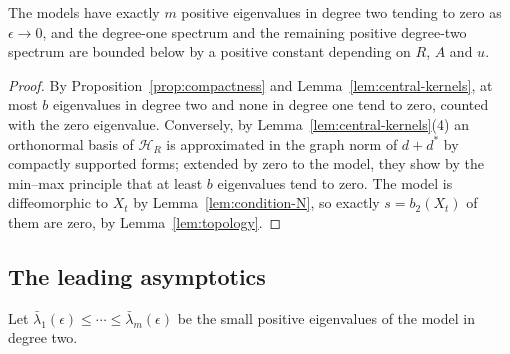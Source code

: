 \begin{proposition}\label{prop:count}
The models have exactly $m$ positive eigenvalues in degree two tending to
zero as $\epsilon\to0$, and the degree-one spectrum and the remaining
positive degree-two spectrum are bounded below by a positive constant
depending on $R$, $A$ and $u$.
\end{proposition}
\begin{proof}
By Proposition~\ref{prop:compactness} and
Lemma~\ref{lem:central-kernels}, at most $b$ eigenvalues in degree two
and none in degree one tend to zero, counted with the zero eigenvalue.
Conversely, by Lemma~\ref{lem:central-kernels}(4) an orthonormal basis of
$\mathcal H_R$ is approximated in the graph norm of $d+d^*$ by compactly
supported forms; extended by zero to the model, they show by the min--max
principle that at least $b$ eigenvalues tend to zero. The model is
diffeomorphic to $X_t$ by Lemma~\ref{lem:condition-N}, so exactly
$s=b_2(X_t)$ of them are zero, by Lemma~\ref{lem:topology}.
\end{proof}

\subsection{The leading asymptotics}
Let $\bar\lambda_1(\epsilon)\le\cdots\le\bar\lambda_m(\epsilon)$ be the
small positive eigenvalues of the model in degree two.

